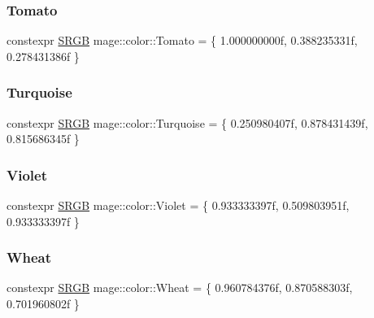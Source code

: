 \hypertarget{namespacemage_1_1color_ace48831c9fff78216d1c88f110da1bdb}{}\label{namespacemage_1_1color_ace48831c9fff78216d1c88f110da1bdb} 
\subsubsection{\texorpdfstring{Tomato}{Tomato}}
{\footnotesize\ttfamily constexpr \hyperlink{structmage_1_1_s_r_g_b}{S\+R\+GB} mage\+::color\+::\+Tomato = \{ 1.\+000000000f, 0.\+388235331f, 0.\+278431386f \}}

\hypertarget{namespacemage_1_1color_a1871b6f0150c91c020319337119e72c9}{}\label{namespacemage_1_1color_a1871b6f0150c91c020319337119e72c9} 
\subsubsection{\texorpdfstring{Turquoise}{Turquoise}}
{\footnotesize\ttfamily constexpr \hyperlink{structmage_1_1_s_r_g_b}{S\+R\+GB} mage\+::color\+::\+Turquoise = \{ 0.\+250980407f, 0.\+878431439f, 0.\+815686345f \}}

\hypertarget{namespacemage_1_1color_a10b518f831070a50ba51e663fbde1223}{}\label{namespacemage_1_1color_a10b518f831070a50ba51e663fbde1223} 
\subsubsection{\texorpdfstring{Violet}{Violet}}
{\footnotesize\ttfamily constexpr \hyperlink{structmage_1_1_s_r_g_b}{S\+R\+GB} mage\+::color\+::\+Violet = \{ 0.\+933333397f, 0.\+509803951f, 0.\+933333397f \}}

\hypertarget{namespacemage_1_1color_ae381a3be6093d5c39d6e9304bea95b8c}{}\label{namespacemage_1_1color_ae381a3be6093d5c39d6e9304bea95b8c} 
\subsubsection{\texorpdfstring{Wheat}{Wheat}}
{\footnotesize\ttfamily constexpr \hyperlink{structmage_1_1_s_r_g_b}{S\+R\+GB} mage\+::color\+::\+Wheat = \{ 0.\+960784376f, 0.\+870588303f, 0.\+701960802f \}}

